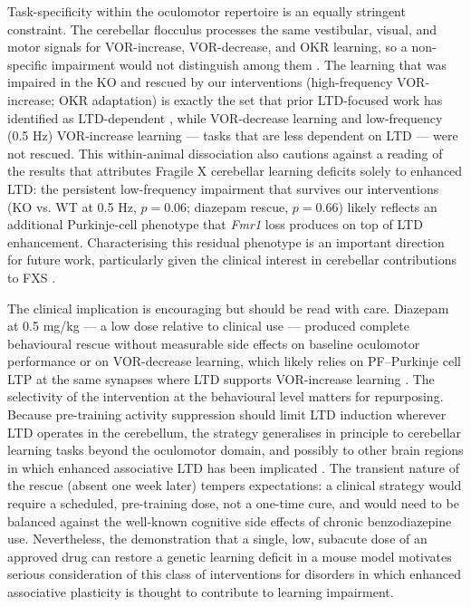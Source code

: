 \documentclass[11pt]{article}
\begin{document}
Task-specificity within the oculomotor repertoire is an equally stringent
constraint. The cerebellar flocculus processes the same vestibular,
visual, and motor signals for VOR-increase, VOR-decrease, and OKR learning,
so a non-specific impairment would not distinguish among them
\citep{boyden2004cerebellum, raymond2018cerebellum}. The learning that
was impaired in the KO and rescued by our interventions (high-frequency
VOR-increase; OKR adaptation) is exactly the set that prior LTD-focused
work has identified as LTD-dependent
\citep{inoshita2018okr, takeuchi2008delphilin, kimpo2014gating,
rowan2018graded}, while VOR-decrease learning and low-frequency (0.5 Hz)
VOR-increase learning --- tasks that are less dependent on LTD
\citep{kimpo2005vor} --- were not rescued. This within-animal dissociation
also cautions against a reading of the results that attributes Fragile X
cerebellar learning deficits solely to enhanced LTD: the persistent
low-frequency impairment that survives our interventions (KO vs. WT at
0.5 Hz, $p = 0.06$; diazepam rescue, $p = 0.66$) likely reflects an
additional Purkinje-cell phenotype that \textit{Fmr1} loss produces on
top of LTD enhancement. Characterising this residual phenotype is an
important direction for future work, particularly given the clinical
interest in cerebellar contributions to FXS
\citep{koekkoek2005fmr1}.

The clinical implication is encouraging but should be read with care.
Diazepam at 0.5 mg/kg --- a low dose relative to clinical use --- produced
complete behavioural rescue without measurable side effects on baseline
oculomotor performance or on VOR-decrease learning, which likely relies on
PF--Purkinje cell LTP at the same synapses where LTD supports VOR-increase
learning \citep{levram2003reversing}. The selectivity of the intervention
at the behavioural level matters for repurposing. Because pre-training
activity suppression should limit LTD induction wherever LTD operates in
the cerebellum, the strategy generalises in principle to cerebellar learning
tasks beyond the oculomotor domain, and possibly to other brain regions in
which enhanced associative LTD has been implicated
\citep{raymond2018cerebellum}. The transient nature of the rescue (absent
one week later) tempers expectations: a clinical strategy would require a
scheduled, pre-training dose, not a one-time cure, and would need to be
balanced against the well-known cognitive side effects of chronic
benzodiazepine use. Nevertheless, the demonstration that a single, low,
subacute dose of an approved drug can restore a genetic learning deficit
in a mouse model motivates serious consideration of this class of
interventions for disorders in which enhanced associative plasticity is
thought to contribute to learning impairment.
\end{document}
